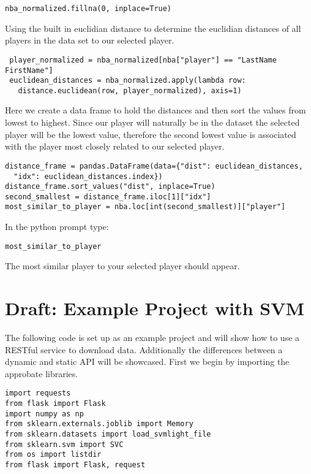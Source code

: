  \begin{lstlisting}
nba_normalized.fillna(0, inplace=True)
\end{lstlisting} 

Using the built in euclidian distance to determine the euclidian
distances of all players in the data set to our selected player.

 \begin{lstlisting}
 player_normalized = nba_normalized[nba["player"] == "LastName FirstName"]
 euclidean_distances = nba_normalized.apply(lambda row:
   distance.euclidean(row, player_normalized), axis=1)
\end{lstlisting} 

Here we create a data frame to hold the distances and then sort the
values from lowest to highest. Since our player will naturally be in
the dataset the selected player will be the lowest value, therefore
the second lowest value is associated with the player most closely
related to our selected player.

\begin{lstlisting}
distance_frame = pandas.DataFrame(data={"dist": euclidean_distances,
  "idx": euclidean_distances.index})
distance_frame.sort_values("dist", inplace=True)
second_smallest = distance_frame.iloc[1]["idx"]
most_similar_to_player = nba.loc[int(second_smallest)]["player"]
\end{lstlisting} 

In the python prompt type: 

\begin{lstlisting}
most_similar_to_player 
\end{lstlisting} 

The most similar player to your selected player should appear. 

\section{Draft: Example Project with SVM}

The following code is set up as an example project and will show how
to use a RESTful service to download data. Additionally the
differences between a dynamic and static API will be showcased. First
we begin by importing the approbate libraries. 

\begin{lstlisting}
import requests
from flask import Flask
import numpy as np
from sklearn.externals.joblib import Memory
from sklearn.datasets import load_svmlight_file
from sklearn.svm import SVC
from os import listdir
from flask import Flask, request
\end{lstlisting} 

